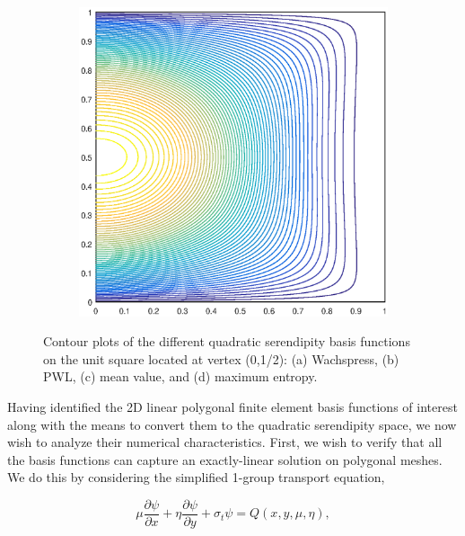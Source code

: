 \documentclass[11pt]{article}
\begin{document}
\begin{figure}
\begin{subfigure}[b]{0.25\textwidth}
		\caption{}
	\end{subfigure}
	\hspace{1cm}
	\begin{subfigure}[b]{0.25\textwidth}
		\centering
		\includegraphics[width=\textwidth]{figures/square_MAXENT2_contour_b8.eps}
		\caption{}
	\end{subfigure}
\caption{Contour plots of the different quadratic serendipity basis functions on the unit square located at vertex (0,1/2): (a) Wachspress, (b) PWL, (c) mean value, and (d) maximum entropy.}
\label{fig::2D_Quadratic_Summary_unit_square_basis_functions_b8}
\end{figure}

Having identified the 2D linear polygonal finite element basis functions of interest along with the means to convert them to the quadratic serendipity space, we now wish to analyze their numerical characteristics. First, we wish to verify that all the basis functions can capture an exactly-linear solution on polygonal meshes. We do this by considering the simplified 1-group transport equation,

\begin{equation}
\label{eq::lin_trans_eq}
\mu \frac{\partial  \psi}{\partial x} + \eta \frac{\partial  \psi}{\partial y} + \sigma_t \psi = Q(x,y,\mu,\eta),
\end{equation}
\end{document}
